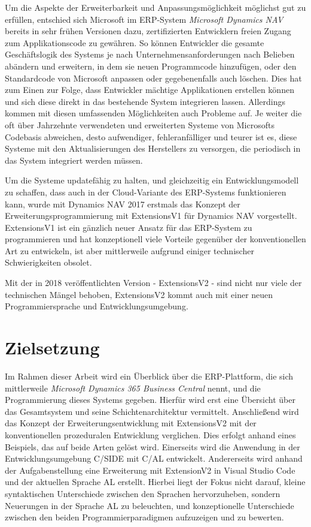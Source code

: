 Um die Aspekte der Erweiterbarkeit und Anpassungsmöglichkeit möglichst gut zu erfüllen, entschied sich Microsoft im ERP-System \textit{Microsoft Dynamics NAV} bereits in sehr frühen Versionen dazu, zertifizierten Entwicklern freien Zugang zum Applikationscode zu gewähren\cite{BrummelPatterns2015}. So können Entwickler die gesamte Geschäftslogik des Systems je nach Unternehmensanforderungen nach Belieben abändern und erweitern, in dem sie neuen Programmcode hinzufügen, oder den Standardcode von Microsoft anpassen oder gegebenenfalls auch löschen. Dies hat zum Einen zur Folge, dass Entwickler mächtige Applikationen erstellen können und sich diese direkt in das bestehende System integrieren lassen. Allerdings kommen mit diesen umfassenden Möglichkeiten auch Probleme auf. Je weiter die oft über Jahrzehnte verwendeten und erweiterten Systeme von Microsofts Codebasis abweichen, desto aufwendiger, fehleranfälliger und teurer ist es, diese Systeme mit den Aktualisierungen des Herstellers zu versorgen, die periodisch in das System integriert werden müssen.  

Um die Systeme updatefähig zu halten, und gleichzeitig ein Entwicklungsmodell zu schaffen, dass auch in der Cloud-Variante des ERP-Systems funktionieren kann, wurde mit Dynamics NAV 2017 erstmals das Konzept der Erweiterungsprogrammierung mit ExtensionsV1 für Dynamics NAV vorgestellt. ExtensionsV1 ist ein gänzlich neuer Ansatz für das ERP-System zu programmieren und hat konzeptionell viele Vorteile gegenüber der konventionellen Art zu entwickeln, ist aber mittlerweile aufgrund einiger technischer Schwierigkeiten obsolet.

Mit der in 2018 veröffentlichten Version - ExtensionsV2 - sind nicht nur viele der technischen Mängel behoben, ExtensionsV2 kommt auch mit einer neuen Programmiersprache und Entwicklungsumgebung.

\section{Zielsetzung}
\label{sec:Zielsetzung}
Im Rahmen dieser Arbeit wird ein Überblick über die ERP-Plattform, die sich mittlerweile \textit{Microsoft Dynamics 365 Business Central} nennt, und die Programmierung dieses Systems gegeben. Hierfür wird erst eine Übersicht über das Gesamtsystem und seine Schichtenarchitektur vermittelt. Anschließend wird das Konzept der Erweiterungsentwicklung mit ExtensionsV2 mit der konventionellen prozeduralen Entwicklung verglichen. Dies erfolgt anhand eines Beispiels, das auf beide Arten gelöst wird. Einerseits wird die Anwendung in der Entwicklungsumgebung C/SIDE mit C/AL entwickelt. Andererseits wird anhand der Aufgabenstellung eine Erweiterung mit ExtensionV2 in Visual Studio Code und der aktuellen Sprache AL erstellt. Hierbei liegt der Fokus nicht darauf, kleine syntaktischen Unterschiede zwischen den Sprachen hervorzuheben, sondern Neuerungen in der Sprache AL zu beleuchten, und konzeptionelle Unterschiede zwischen den beiden Programmierparadigmen aufzuzeigen und zu bewerten.

